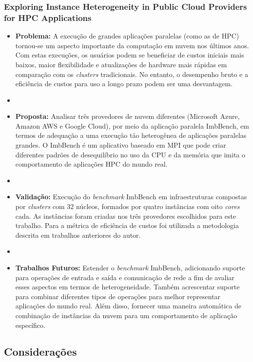 \documentclass[tese,capa]{texufpel}
\begin{document}
\subsubsection{Exploring Instance Heterogeneity in Public Cloud Providers for HPC Applications \cite{roloffExploringInstanceHeterogeneity2019a}}

\begin{itemize}[label={},noitemsep]
  \item \textbf{Problema:} A execução de grandes aplicações paralelas (como as de HPC) tornou-se um aspecto importante da computação em nuvem nos últimos anos. Com estas execuções, os usuários podem se beneficiar de custos iniciais mais baixos, maior flexibilidade e atualizações de hardware mais rápidas em comparação com os \textit{clusters} tradicionais. No entanto, o desempenho bruto e a eficiência de custos para uso a longo prazo podem ser uma desvantagem.
  \item 
  \item \textbf{Proposta:} Analisar três provedores de nuvem diferentes (Microsoft Azure, Amazon AWS e Google Cloud), por meio da aplicação paralela ImbBench, em termos de adequação a uma execução tão heterogênea de aplicações paralelas grandes. O ImbBench é um aplicativo baseado em MPI que pode criar diferentes padrões de desequilíbrio no uso da CPU e da memória que imita o comportamento de aplicações HPC do mundo real.
  \item 
  \item \textbf{Validação:} Execução do \textit{benchmark} ImbBench em infraestruturas compostas por \textit{clusters} com 32 núcleos, formados por quatro instâncias com oito \textit{cores} cada. As instâncias foram criadas nos três provedores escolhidos para este trabalho. Para a métrica de eficiência de custos foi utilizada a metodologia descrita em trabalhos anteriores do autor.
  \item 
  \item \textbf{Trabalhos Futuros:} Estender o \textit{benchmark} ImbBench, adicionando suporte para operações de entrada e saída e comunicação de rede a fim de avaliar esses aspectos em termos de heterogeneidade. Também acrescentar suporte para combinar diferentes tipos de operações para melhor representar aplicações do mundo real. Além disso, fornecer uma maneira automática de combinação de instâncias da nuvem para um comportamento de aplicação específico.
\end{itemize}

\subsection{Considerações}
\end{document}
